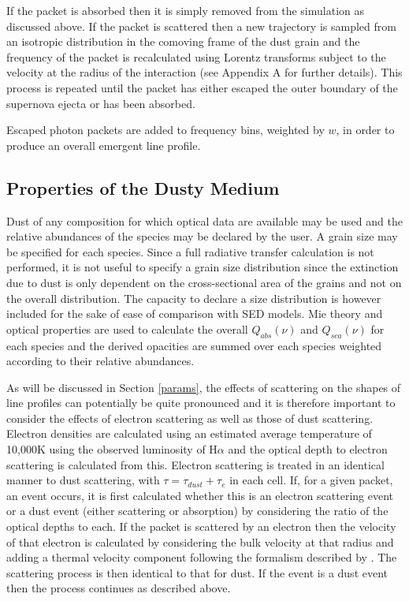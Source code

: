 \documentclass[useAMS,usenatbib,usegraphicx]{mnras}
\begin{document}
If the packet is absorbed then it is simply removed from the simulation as 
discussed above.  If the packet is scattered then a new trajectory is 
sampled from an isotropic distribution in the comoving frame of the dust 
grain and the frequency of the packet is recalculated using Lorentz 
transforms subject to the velocity at the radius of the interaction (see 
Appendix A for further details).  This process is repeated until the 
packet has either escaped the outer boundary of the supernova ejecta or has been 
absorbed.
   
Escaped photon packets are added to frequency bins, weighted by $w$, in order to 
produce an overall emergent line profile.


\subsection{Properties of the Dusty Medium}

Dust of any composition for which optical data are available may be used
and the relative abundances of the species may be declared by the user.  
A grain size may be specified for each species.  Since a full radiative 
transfer calculation is not performed, it is not useful to specify a grain 
size distribution since the extinction due to dust is only dependent on the 
cross-sectional area of the grains and not on the overall distribution.  
The capacity to declare a size distribution is however included for the 
sake of ease of comparison with SED models.  Mie theory and optical properties are used 
to calculate the overall $Q_{abs}(\nu)$ and $Q_{sca}(\nu)$ for each 
species and the derived opacities are summed over each species weighted 
according to their relative abundances.


As will be discussed in Section \ref{params}, the effects of scattering 
on the shapes of line profiles can potentially be quite pronounced and it 
is therefore important to consider the effects of electron 
scattering as well as those of dust scattering.  Electron densities are 
calculated using an estimated average temperature of 10,000K using the observed luminosity 
of H${\alpha}$ and the optical depth to electron scattering is calculated from this.  
Electron scattering is treated in an identical manner to dust scattering, 
with $\tau = \tau_{dust}+\tau_{e}$ in each cell.  If, for a given 
packet, an event occurs, it is first calculated whether this is an electron scattering event or a dust 
event (either scattering or absorption) by considering the ratio of the optical depths to each.  If the packet is scattered by an electron then the velocity of that electron is calculated by considering the bulk velocity at that radius and adding a thermal velocity component following the formalism described by \citet{Hillier1991}.  The scattering 
process is then identical to that for dust.  If the event is a dust event then the process continues as described above.
\end{document}
